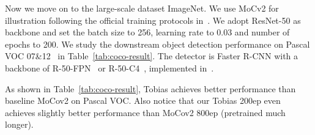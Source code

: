 \documentclass[letterpaper]{article} %
\begin{document}
Now we move on to the large-scale dataset ImageNet. We use MoCv2 for illustration following the official training protocols in~\citep{mocov2:xinlei:arxiv2020}. We adopt ResNet-50 as backbone and set the batch size to 256, learning rate to 0.03 and number of epochs to 200. We study the downstream object detection performance on Pascal VOC 07\&12~\citep{VOC:mark:IJCV10} in Table~\ref{tab:coco-result}. The detector is Faster R-CNN with a backbone of R-50-FPN~\citep{FPN:kaiming:CVPR17} or R-50-C4~\citep{mask-rcnn:he:ICCV17}, implemented in~\citep{wu2019detectron2}.

As shown in Table~\ref{tab:coco-result}, Tobias achieves better performance than baseline MoCov2 on Pascal VOC. Also notice that our Tobias 200ep even achieves slightly better performance than MoCov2 800ep (pretrained much longer).
\end{document}
